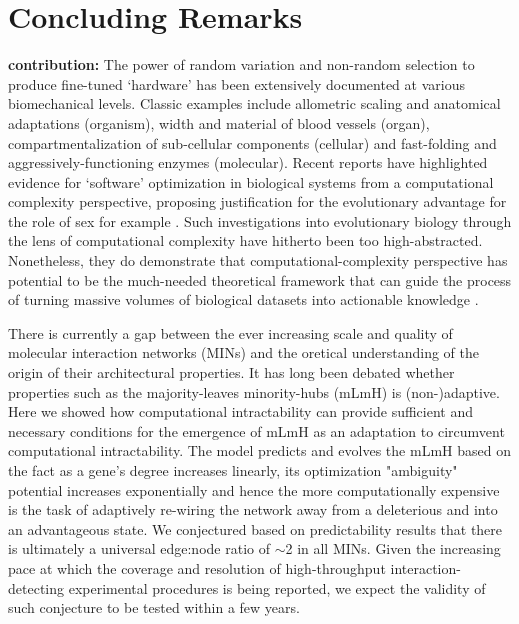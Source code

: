 \section{Concluding Remarks}

\textbf{contribution:} The power of random variation and non-random selection
    to produce fine-tuned `hardware' has been extensively documented at various biomechanical levels. Classic examples include
    allometric scaling and anatomical adaptations (organism), width and material of blood vessels (organ), %
    compartmentalization of sub-cellular components (cellular) and fast-folding and aggressively-functioning enzymes (molecular).
    Recent reports \cite{livnat_analytical_2011, chastain_algorithms_2014} have highlighted evidence for `software' optimization in biological systems from a computational complexity perspective, proposing justification for the evolutionary advantage for the role of sex for example \cite{livnat_sex_2016}.
    Such investigations into evolutionary biology through the lens of computational complexity have hitherto been too high-abstracted. Nonetheless, they do demonstrate that computational-complexity perspective has potential to be the much-needed theoretical framework that can guide the process of turning massive volumes of biological datasets into actionable knowledge \cite{brenner_turing_2012}.

    There is currently  a gap between the ever increasing scale and quality of molecular interaction networks (MINs) and the oretical understanding of the origin of their architectural properties. It has long been debated whether properties such as the majority-leaves minority-hubs (mLmH) is (non-)adaptive. Here we showed how computational intractability can provide sufficient and necessary conditions for the emergence of mLmH as an adaptation to circumvent computational intractability. The model predicts and evolves the mLmH based on the fact as a gene's degree increases linearly, its optimization "ambiguity" potential increases exponentially and hence the more computationally expensive is the task of adaptively re-wiring the network away from a deleterious and into an advantageous state. We conjectured based on predictability results that there is ultimately  a universal edge:node ratio of ${\sim}$2 in all MINs. Given the increasing pace at which the coverage \cite{gerstein_architecture_2012,rolland_proteome-scale_2014} and resolution \cite{han_trrust:_2015,yang_widespread_2016} of high-throughput interaction-detecting experimental procedures is being reported, we expect the validity of such conjecture to be tested within a few years.


